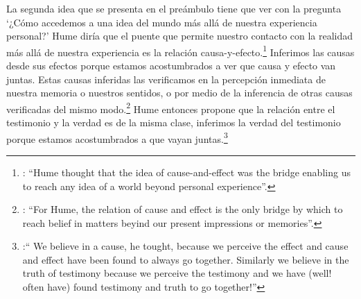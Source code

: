 La segunda idea que se presenta en el preámbulo tiene que ver con la pregunta \enquote*{¿Cómo accedemos a una idea del mundo más allá de nuestra experiencia personal?} Hume diría que el puente que permite nuestro contacto con la realidad más allá de nuestra experiencia es la relación causa-y-efecto.\footnote{\cite[Cf.][3]{anscombe2008faith:tobelieve}: \enquote{Hume thought that the idea of cause-and-effect was the bridge enabling us to reach any idea of a world beyond personal experience}.} Inferimos las causas desde sus efectos porque estamos acostumbrados a ver que causa y efecto van juntas. Estas causas inferidas las verificamos en la percepción inmediata de nuestra memoria o nuestros sentidos, o por medio de la inferencia de otras causas verificadas del mismo modo.\footnote{\cite[Cf.][87]{anscombe1981parmenides:humeandjulius}: \enquote{For Hume, the relation of cause and effect is the only bridge by which to reach belief in matters beyind our present impressions or memories}.} Hume entonces propone que la relación entre el testimonio y la verdad es de la misma clase, inferimos la verdad del testimonio porque estamos acostumbrados a que vayan juntas.\footnote{\cite[Cf.][3]{anscombe2008faith:tobelieve}:\enquote{ We believe in a cause, he tought, because we perceive the effect and cause and effect have been found to always go together. Similarly we believe in the truth of testimony because we perceive the testimony and we have (well! often have) found testimony and truth to go together!}}

